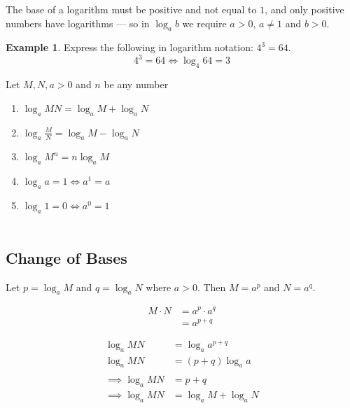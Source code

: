 \documentclass[11pt,a4paper]{article}
\theoremstyle{definition}
\newtheorem{example}[thm]{Example}
\begin{document}
The base of a logarithm must be positive and not equal to $1$, and only positive numbers have logarithms --- so in $\log_{a}b$ we require $a>0$, $a\neq 1$ and $b>0$.\\


\begin{example}

Express the following in logarithm notation: $4^{3}=64$.
$$4^{3}=64\iff \log_{4}64=3$$


Let $M,N, a>0$ and $n$ be any number\\
\begin{enumerate}
\item $\log_{\displaystyle{a}}MN =\log_{\displaystyle{a}}M+\log_{\displaystyle{a}}N$
\item $\log_{\displaystyle{a}}\frac{M}{N}=\log_{\displaystyle{a}}M-\log_{\displaystyle{a}}N$
\item $\log_{\displaystyle{a}}M^{\displaystyle{n}} = n\log_{\displaystyle{a}}M$
\item $\log_{\displaystyle{a}}a=1\iff a^1=a$
\item $\log_{\displaystyle{a}}1=0 \iff a^{0}=1$\\\\
\end{enumerate}
\end{example}
\subsection{Change of Bases}
Let $p=\log_{\displaystyle{a}}M$ and $q=\log_{\displaystyle{a}}N$ where $a>0$. Then $M=a^{\displaystyle{p}}$ and $N=a^{\displaystyle{q}}$.


\begin{align*}
M\cdot N & = a^{\displaystyle{p}}\cdot a^{\displaystyle{q}}\\ 
         & = a^{\displaystyle{p+q}}
\end{align*}



\begin{align*}
\log_{\displaystyle{a}}MN & = \log_{\displaystyle{a}}a^{\displaystyle{p+q}}\\
\log_{\displaystyle{a}}MN & =(p+q) \log_{\displaystyle{a}}a\\\\
\implies \log_{\displaystyle{a}}MN & = p+q\\
\implies \log_{\displaystyle{a}}MN & = \log_{\displaystyle{a}}M+\log_{\displaystyle{a}}N
\end{align*}
\end{document}
